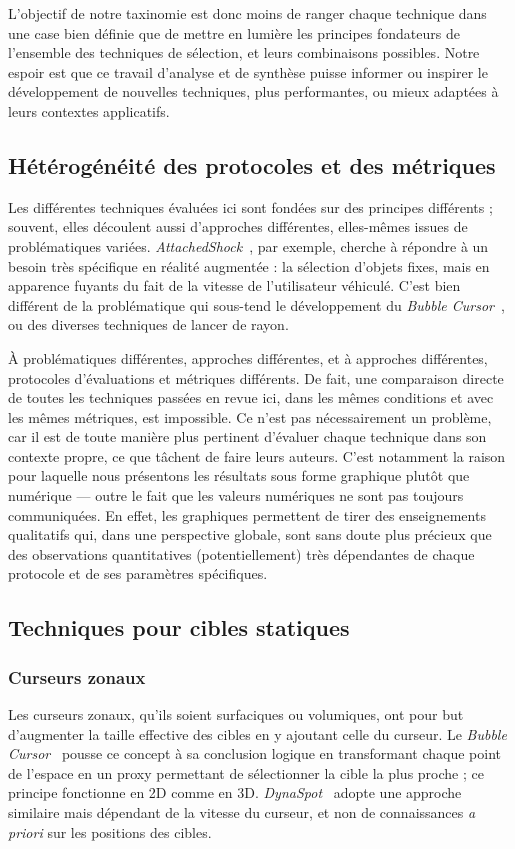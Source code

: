     L'objectif de notre taxinomie est donc moins de ranger chaque technique dans une case bien définie que de mettre en lumière les principes fondateurs de l'ensemble des techniques de sélection, et leurs combinaisons possibles. Notre espoir est que ce travail d'analyse et de synthèse puisse informer ou inspirer le développement de nouvelles techniques, plus performantes, ou mieux adaptées à leurs contextes applicatifs.
    
    \subsection{Hétérogénéité des protocoles et des métriques}
    Les différentes techniques évaluées ici sont fondées sur des principes différents ; souvent, elles découlent aussi d'approches différentes, elles-mêmes issues de problématiques variées. \emph{AttachedShock}~\cite{you2012attachedshock, you2014attachedshock}, par exemple, cherche à répondre à un besoin très spécifique en réalité augmentée : la sélection d'objets fixes, mais en apparence \og fuyants \fg{} du fait de la vitesse de l'utilisateur véhiculé. C'est bien différent de la problématique qui sous-tend le développement du \emph{Bubble Cursor}~\cite{grossman2005bubble}, ou des diverses techniques de lancer de rayon.
    
    À problématiques différentes, approches différentes, et à approches différentes, protocoles d'évaluations et métriques différents. De fait, une comparaison directe de toutes les techniques passées en revue ici, dans les mêmes conditions et avec les mêmes métriques, est impossible. Ce n'est pas nécessairement un problème, car il est de toute manière plus pertinent d'évaluer chaque technique dans son contexte propre, ce que tâchent de faire leurs auteurs. C'est notamment la raison pour laquelle nous présentons les résultats sous forme graphique plutôt que numérique --- outre le fait que les valeurs numériques ne sont pas toujours communiquées. En effet, les graphiques permettent de tirer des enseignements qualitatifs qui, dans une perspective globale, sont sans doute plus précieux que des observations quantitatives (potentiellement) très dépendantes de chaque protocole et de ses paramètres spécifiques.
    
    \subsection{Techniques pour cibles statiques}
	\subsubsection{Curseurs zonaux}
    Les curseurs zonaux, qu'ils soient surfaciques ou volumiques, ont pour but d'augmenter la taille effective des cibles en y ajoutant celle du curseur. Le \emph{Bubble Cursor}~\cite{grossman2005bubble} pousse ce concept à sa conclusion logique en transformant chaque point de l'espace en un proxy permettant de sélectionner la cible la plus proche ; ce principe fonctionne en 2D comme en 3D. \emph{DynaSpot}~\cite{chapuis2009dynaspot} adopte une approche similaire mais dépendant de la vitesse du curseur, et non de connaissances \emph{a priori} sur les positions des cibles.
    
